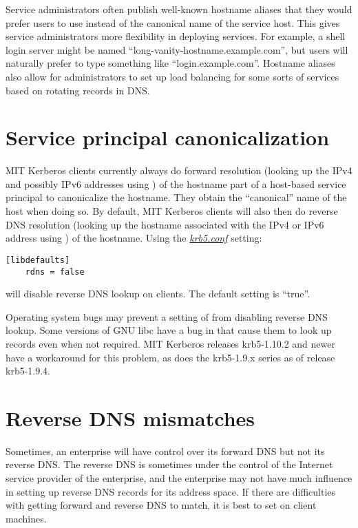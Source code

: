 \documentclass[letterpaper,10pt,english]{sphinxmanual}
\begin{document}
Service administrators often publish well-known hostname aliases that
they would prefer users to use instead of the canonical name of the
service host.  This gives service administrators more flexibility in
deploying services.  For example, a shell login server might be named
``long-vanity-hostname.example.com'', but users will naturally prefer to
type something like ``login.example.com''.  Hostname aliases also allow
for administrators to set up load balancing for some sorts of services
based on rotating  records in DNS.


\section{Service principal canonicalization}
\label{admin/princ_dns:service-principal-canonicalization}
MIT Kerberos clients currently always do forward resolution (looking
up the IPv4 and possibly IPv6 addresses using ) of
the hostname part of a host-based service principal to canonicalize
the hostname.  They obtain the ``canonical'' name of the host when doing
so.  By default, MIT Kerberos clients will also then do reverse DNS
resolution (looking up the hostname associated with the IPv4 or IPv6
address using ) of the hostname.  Using the
{\hyperref[admin/conf_files/krb5_conf:krb5-conf-5]{\emph{krb5.conf}}} setting:

\begin{Verbatim}[commandchars=\\\{\}]
[libdefaults]
    rdns = false
\end{Verbatim}

will disable reverse DNS lookup on clients.  The default setting is
``true''.

Operating system bugs may prevent a setting of  from
disabling reverse DNS lookup.  Some versions of GNU libc have a bug in
 that cause them to look up  records even when
not required.  MIT Kerberos releases krb5-1.10.2 and newer have a
workaround for this problem, as does the krb5-1.9.x series as of
release krb5-1.9.4.


\section{Reverse DNS mismatches}
\label{admin/princ_dns:reverse-dns-mismatches}
Sometimes, an enterprise will have control over its forward DNS but
not its reverse DNS.  The reverse DNS is sometimes under the control
of the Internet service provider of the enterprise, and the enterprise
may not have much influence in setting up reverse DNS records for its
address space.  If there are difficulties with getting forward and
reverse DNS to match, it is best to set  on client
machines.
\end{document}
